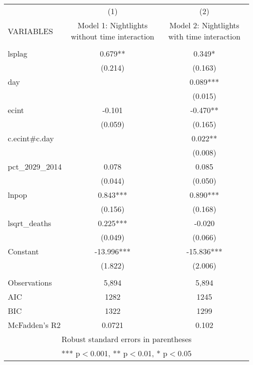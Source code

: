 \documentclass[]{article}
\begin{document}
\begin{tabular}{lcc} \hline
 & (1) & (2) \\
VARIABLES & Model 1: Nightlights without time interaction & Model 2: Nightlights with time interaction \\ \hline
 &  &  \\
lsplag & 0.679** & 0.349* \\
 & (0.214) & (0.163) \\
day &  & 0.089*** \\
 &  & (0.015) \\
ecint & -0.101 & -0.470** \\
 & (0.059) & (0.165) \\
c.ecint\#c.day &  & 0.022** \\
 &  & (0.008) \\
pct\_2029\_2014 & 0.078 & 0.085 \\
 & (0.044) & (0.050) \\
lnpop & 0.843*** & 0.890*** \\
 & (0.156) & (0.168) \\
lsqrt\_deaths & 0.225*** & -0.020 \\
 & (0.049) & (0.066) \\
Constant & -13.996*** & -15.836*** \\
 & (1.822) & (2.006) \\
 &  &  \\
Observations & 5,894 & 5,894 \\
AIC & 1282 & 1245 \\
BIC & 1322 & 1299 \\
 McFadden's R2 & 0.0721 & 0.102 \\ \hline
\multicolumn{3}{c}{ Robust standard errors in parentheses} \\
\multicolumn{3}{c}{ *** p$<$0.001, ** p$<$0.01, * p$<$0.05} \\
\end{tabular}
\end{document}
